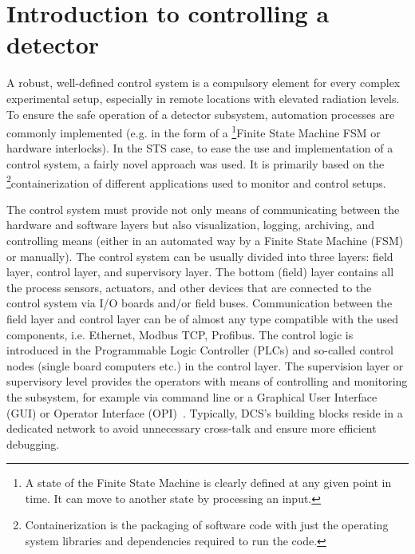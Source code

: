 \section{Introduction to controlling a detector}
A robust, well-defined control system is a compulsory element for every complex experimental setup, especially in remote locations with elevated radiation levels. To ensure the safe operation of a detector subsystem, automation processes are commonly implemented (e.g. in the form of a \footnote{A state of the Finite State Machine is clearly defined at any given point in time. It can move to another state by processing an input.}{Finite State Machine} \gls{FSM} or hardware interlocks). In the \gls{STS} case, to ease the use and implementation of a control system, a fairly novel approach was used. It is primarily based on the \footnote{Containerization is the packaging of software code with just the operating system libraries and dependencies required to run the code.}{containerization} of different applications used to monitor and control setups. 




The control system must provide not only means of communicating between the hardware and software layers but also visualization, logging, archiving, and controlling means (either in an automated way by a Finite State Machine (\gls{FSM}) or manually). The control system can be usually divided into three layers: field layer, control layer, and supervisory layer. The bottom (field) layer contains all the process sensors, actuators, and other devices that are connected to the control system via I/O boards and/or field buses. Communication between the field layer and control layer can be of almost any type compatible with the used components, i.e. Ethernet, Modbus \gls{TCP}, Profibus. The control logic is introduced in the Programmable Logic Controller (\glspl{PLC}) and so-called control nodes (single board computers etc.) in the control layer. The supervision layer or supervisory level provides the operators with means of controlling and monitoring the subsystem, for example via command line or a Graphical User Interface (\gls{GUI}) or Operator Interface (\gls{OPI})~\cite{layers}.  Typically, DCS's building blocks reside in a dedicated network to avoid unnecessary cross-talk and ensure more efficient debugging.

